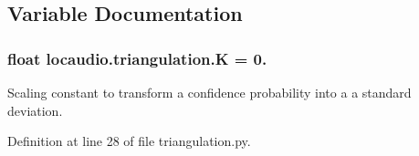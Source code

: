 \subsection{Variable Documentation}
\hypertarget{namespacelocaudio_1_1triangulation_ac85bcbed961d15baa586ddc0192860bb}{
\subsubsection[{K}]{\setlength{\rightskip}{0pt plus 5cm}float locaudio.\-triangulation.\-K = 0.}}\label{namespacelocaudio_1_1triangulation_ac85bcbed961d15baa586ddc0192860bb}


Scaling constant to transform a confidence probability into a a standard deviation. 



Definition at line 28 of file triangulation.\-py.

